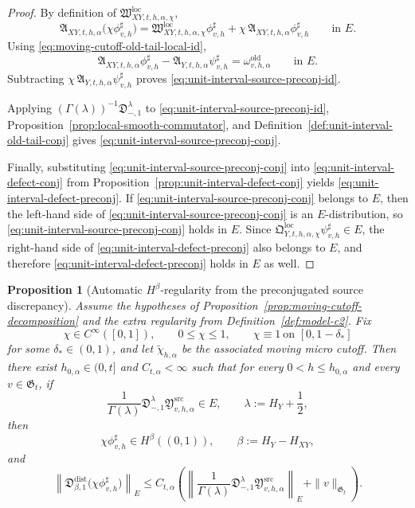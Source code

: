 \documentclass[11pt,a4paper]{amsart}
\theoremstyle{plain}
\newtheorem{proposition}[theorem]{Proposition}
\theoremstyle{definition}
\theoremstyle{remark}
\begin{document}
\begin{proof}
By definition of \(\mathfrak W_{XY,t,h,\alpha,\chi}^{\mathrm{loc}}\),
\[
\mathfrak A_{XY,t,h,\alpha}
\bigl(
\chi\phi_{v,h}^{\sharp}
\bigr)
=
\mathfrak W_{XY,t,h,\alpha,\chi}^{\mathrm{loc}}\phi_{v,h}^{\sharp}
+
\chi\,\mathfrak A_{XY,t,h,\alpha}\phi_{v,h}^{\sharp}
\qquad\text{in }E.
\]
Using \eqref{eq:moving-cutoff-old-tail-local-id},
\[
\mathfrak A_{XY,t,h,\alpha}\phi_{v,h}^{\sharp}
-\mathfrak A_{Y,t,h,\alpha}\psi_{v,h}^{\sharp}
=
\omega_{v,h,\alpha}^{\mathrm{old}}
\qquad\text{in }E.
\]
Subtracting \(\chi\,\mathfrak A_{Y,t,h,\alpha}\psi_{v,h}^{\sharp}\) proves
\eqref{eq:unit-interval-source-preconj-id}.

Applying \((\Gamma(\lambda))^{-1}\mathfrak D_{-,1}^{\lambda}\) to
\eqref{eq:unit-interval-source-preconj-id}, Proposition~\ref{prop:local-smooth-commutator}, and
Definition~\ref{def:unit-interval-old-tail-conj} gives
\eqref{eq:unit-interval-source-preconj-conj}.

Finally, substituting \eqref{eq:unit-interval-source-preconj-conj} into
\eqref{eq:unit-interval-defect-conj} from Proposition~\ref{prop:unit-interval-defect-conj} yields
\eqref{eq:unit-interval-defect-preconj}. If
\eqref{eq:unit-interval-source-preconj-conj} belongs to \(E\), then
the left-hand side of \eqref{eq:unit-interval-source-preconj-conj} is an \(E\)-distribution, so
\eqref{eq:unit-interval-source-preconj-conj} holds in \(E\). Since
\(\mathfrak Q_{Y,t,h,\alpha,\chi}^{\mathrm{loc}}\psi_{v,h}^{\sharp}\in E\), the right-hand side of
\eqref{eq:unit-interval-defect-preconj} also belongs to \(E\), and therefore
\eqref{eq:unit-interval-defect-preconj} holds in \(E\) as well.
\end{proof}

\begin{proposition}[Automatic \(H^\beta\)-regularity from the preconjugated source discrepancy]
\label{prop:unit-interval-source-preconj-regularity}
Assume the hypotheses of Proposition~\ref{prop:moving-cutoff-decomposition} and the extra regularity
from Definition~\ref{def:model-c2}. Fix
\[
\chi\in C^\infty([0,1]),
\qquad
0\le \chi\le1,
\qquad
\chi\equiv1\ \text{on }[0,1-\delta_*]
\]
for some \(\delta_*\in(0,1)\), and let \(\widetilde\chi_{h,\alpha}\) be the associated moving micro
cutoff. Then there exist \(h_{0,\alpha}\in(0,t]\) and \(C_{t,\alpha}<\infty\) such that for every
\(0<h\le h_{0,\alpha}\) and every \(v\in\mathfrak G_t\), if
\begin{equation}\label{eq:unit-interval-source-preconj-regularity-hyp}
\frac{1}{\Gamma(\lambda)}
\mathfrak D_{-,1}^{\lambda}
\mathfrak Y_{v,h,\alpha}^{\mathrm{src}}
\in E,
\qquad
\lambda:=H_Y+\frac12,
\end{equation}
then
\[
\chi\phi_{v,h}^{\sharp}\in H^\beta((0,1)),
\qquad
\beta:=H_Y-H_{XY},
\]
and
\begin{equation}\label{eq:unit-interval-source-preconj-regularity-bound}
\left\|
\mathfrak D_{\beta,1}^{\mathrm{dist}}
\bigl(
\chi\phi_{v,h}^{\sharp}
\bigr)
\right\|_{E}
\le
C_{t,\alpha}
\left(
\left\|
\frac{1}{\Gamma(\lambda)}
\mathfrak D_{-,1}^{\lambda}
\mathfrak Y_{v,h,\alpha}^{\mathrm{src}}
\right\|_{E}
+
\|v\|_{\mathfrak G_t}
\right).
\end{equation}
\end{proposition}
\end{document}
